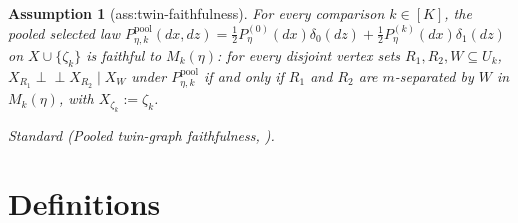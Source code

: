 \documentclass{article}
\newtheorem{assumption}{Assumption}
\begin{document}
\begin{assumption}[ass:twin-faithfulness]\label{ass:twin-faithfulness}
For every comparison \(k\in[K]\), the pooled selected law \(P_{\eta,k}^{\mathrm{pool}}(dx,dz)=\tfrac12P_{\eta}^{(0)}(dx)\delta_0(dz)+\tfrac12P_{\eta}^{(k)}(dx)\delta_1(dz)\) on \(X\cup\{\zeta_k\}\) is faithful to \(M_k(\eta)\): for every disjoint vertex sets \(R_1,R_2,W\subseteq U_k\), \(X_{R_1}\mathbin{\perp\!\!\!\perp}X_{R_2}\mid X_W\) under \(P_{\eta,k}^{\mathrm{pool}}\) if and only if \(R_1\) and \(R_2\) are \(m\)-separated by \(W\) in \(M_k(\eta)\), with \(X_{\zeta_k}:=\zeta_k\).
\par\smallskip\noindent\emph{Standard} (Pooled twin-graph faithfulness, \cite{DaiEtAl2025SelectionIntervention}).
\end{assumption}

\section{Definitions}
\end{document}
